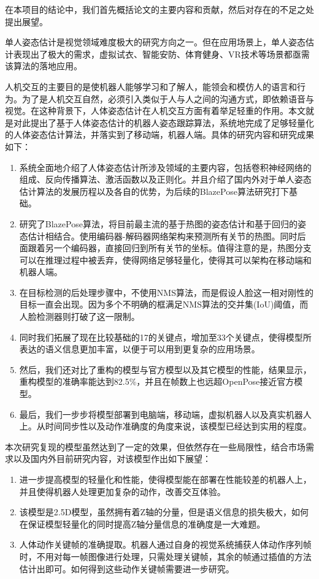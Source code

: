 \begin{conclusions}

在本项目的结论中，我们首先概括论文的主要内容和贡献，然后对存在的不足之处提出展望。

单人姿态估计是视觉领域难度极大的研究方向之一。但在应用场景上，单人姿态估计表现出了极大的需求，虚拟试衣、智能安防、体育健身、VR技术等场景都亟需该算法的落地应用。

人机交互的主要目的是使机器人能够学习和了解人，能领会和模仿人的语言和行为。为了是人机交互自然，必须引入类似于人与人之间的沟通方式，即依赖语音与视觉。在这种背景下，人体姿态估计在人机交互方面有着举足轻重的作用。本文就是对此提出了基于人体姿态估计的机器人姿态跟踪算法，系统地完成了足够轻量化的人体姿态估计算法，并落实到了移动端，机器人端。具体的研究内容和研究成果如下：

\begin{enumerate}
\item 系统全面地介绍了人体姿态估计所涉及领域的主要内容，包括卷积神经网络的组成、反向传播算法、激活函数以及正则化。并且介绍了国内外对于单人姿态估计算法的发展历程以及各自的优势，为后续的BlazePose算法研究打下基础。

\item 研究了BlazePose算法，将目前最主流的基于热图的姿态估计和基于回归的姿态估计相结合。使用编码器-解码器网络架构来预测所有关节的热图。同时后面跟着另一个编码器，直接回归到所有关节的坐标。值得注意的是，热图分支可以在推理过程中被丢弃，使得网络足够轻量化，使得其可以架构在移动端和机器人端。

\item 在目标检测的后处理步骤中，不使用NMS算法，而是假设人脸这一相对刚性的目标一直会出现。因为多个不明确的框满足NMS算法的交并集(IoU)阈值，而人脸检测器则打破了这一限制。

\item 同时我们拓展了现在比较基础的17的关键点，增加至33个关键点，使得模型所表达的语义信息更加丰富，以便于可以用到更复杂的应用场景。

\item 然后，我们还对比了重构的模型与官方模型以及其它模型的性能，结果显示，重构模型的准确率能达到82.5\%，并且在帧数上也远超OpenPose接近官方模型。

\item 最后，我们一步步将模型部署到电脑端，移动端，虚拟机器人以及真实机器人上。从时间同步性以及动作准确度的角度来说，该模型已经达到实用的程度。
\end{enumerate}

本次研究复现的模型虽然达到了一定的效果，但依然存在一些局限性，结合市场需求以及国内外目前研究内容，对该模型作出如下展望：

\begin{enumerate}
\item 进一步提高模型的轻量化和性能，使得模型能在部署在性能较差的机器人上，并且使得机器人处理更加复杂的动作，改善交互体验。

\item 该模型是2.5D模型，虽然拥有着Z轴的分量，但是语义信息的损失极大，如何在保证模型轻量化的同时提高Z轴分量信息的准确度是一大难题。

\item 人体动作关键帧的准确提取。机器人通过自身的视觉系统捕获人体动作序列帧时，不用对每一帧图像进行处理，只需处理关键帧，其余的帧通过插值的方法估计出即可。如何得到这些动作关键帧需要进一步研究。
\end{enumerate}

\end{conclusions}
